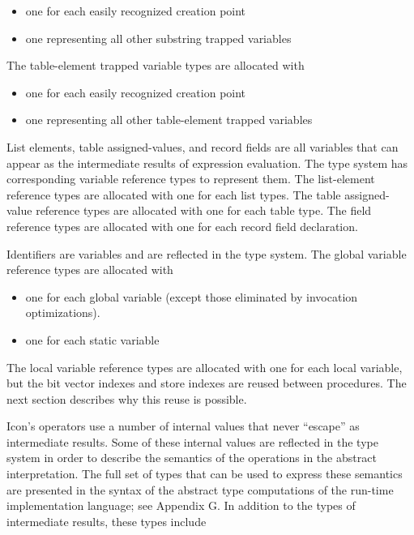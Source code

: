 \liststyleLxxx
\begin{itemize}
\item 
one for each easily recognized creation point 
\item 
one representing all other substring trapped variables 
\end{itemize}

The table-element trapped variable types are allocated with 

\liststyleLxxxi
\begin{itemize}
\item 
one for each easily recognized creation point 
\item 
one representing all other table-element trapped variables 
\end{itemize}

List elements, table assigned-values, and record fields are all
variables that can appear as the intermediate results of expression
evaluation. The type system has corresponding variable reference types
to represent them. The list-element reference types are allocated with
one for each list types. The table assigned-value reference types are
allocated with one for each table type. The field reference types are
allocated with one for each record field declaration.

Identifiers are variables and are reflected in the type system. The
global variable reference types are allocated with

\liststyleLxxxii
\begin{itemize}
\item 
one for each global variable (except those eliminated by invocation optimizations). 
\item 
one for each static variable 
\end{itemize}

The local variable reference types are allocated with one for each
local variable, but the bit vector indexes and store indexes are
reused between procedures. The next section describes why this reuse
is possible.

Icon's operators use a number of internal values that never ``escape''
as intermediate results. Some of these internal values are reflected
in the type system in order to describe the semantics of the
operations in the abstract interpretation. The full set of types that
can be used to express these semantics are presented in the syntax of
the abstract type computations of the run-time implementation
language; see Appendix G. In addition to the types of intermediate
results, these types include

